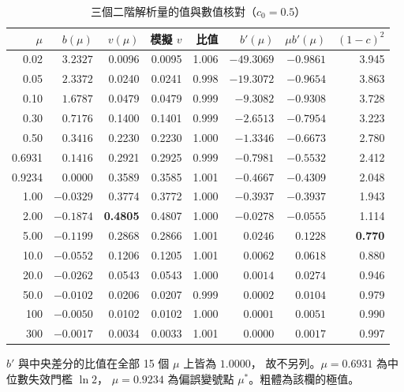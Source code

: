 \documentclass[UTF8, fontset=macnew, a4paper, 12pt]{ctexart}
\begin{document}
\begin{table}[H]
\centering
\caption{三個二階解析量的值與數值核對（$c_0=0.5$）}
\small
\begin{tabular}{rrrrrrrr}
\toprule
$\mu$ & $b(\mu)$ & $v(\mu)$ & 模擬 $v$ & 比值 & $b'(\mu)$ & $\mu b'(\mu)$ & $(1-c)^2$\\
\midrule
0.02   & $3.2327$  & 0.0096 & 0.0095 & 1.006 & $-49.3069$ & $-0.9861$ & 3.945\\
0.05   & $2.3372$  & 0.0240 & 0.0241 & 0.998 & $-19.3072$ & $-0.9654$ & 3.863\\
0.10   & $1.6787$  & 0.0479 & 0.0479 & 0.999 & $-9.3082$  & $-0.9308$ & 3.728\\
0.30   & $0.7176$  & 0.1400 & 0.1401 & 0.999 & $-2.6513$  & $-0.7954$ & 3.223\\
0.50   & $0.3416$  & 0.2230 & 0.2230 & 1.000 & $-1.3346$  & $-0.6673$ & 2.780\\
0.6931 & $0.1416$  & 0.2921 & 0.2925 & 0.999 & $-0.7981$  & $-0.5532$ & 2.412\\
0.9234 & $0.0000$  & 0.3589 & 0.3585 & 1.001 & $-0.4667$  & $-0.4309$ & 2.048\\
1.00   & $-0.0329$ & 0.3774 & 0.3772 & 1.000 & $-0.3937$  & $-0.3937$ & 1.943\\
2.00   & $-0.1874$ & \textbf{0.4805} & 0.4807 & 1.000 & $-0.0278$ & $-0.0555$ & 1.114\\
5.00   & $-0.1199$ & 0.2868 & 0.2866 & 1.001 & $0.0246$ & $0.1228$ & \textbf{0.770}\\
10.0   & $-0.0552$ & 0.1206 & 0.1205 & 1.001 & $0.0062$ & $0.0618$ & 0.880\\
20.0   & $-0.0262$ & 0.0543 & 0.0543 & 1.000 & $0.0014$ & $0.0274$ & 0.946\\
50.0   & $-0.0102$ & 0.0206 & 0.0207 & 0.999 & $0.0002$ & $0.0104$ & 0.979\\
100    & $-0.0050$ & 0.0102 & 0.0102 & 1.000 & $0.0001$ & $0.0051$ & 0.990\\
300    & $-0.0017$ & 0.0034 & 0.0033 & 1.001 & $0.0000$ & $0.0017$ & 0.997\\
\bottomrule
\end{tabular}

\vspace{3pt}
{\footnotesize $b'$ 與中央差分的比值在全部 15 個 $\mu$ 上皆為 $1.0000$，
故不另列。$\mu=0.6931$ 為中位數失效門檻 $\ln2$，
$\mu=0.9234$ 為偏誤變號點 $\mu^{\ast}$。粗體為該欄的極值。}
\label{tab:v1}
\end{table}
\end{document}
